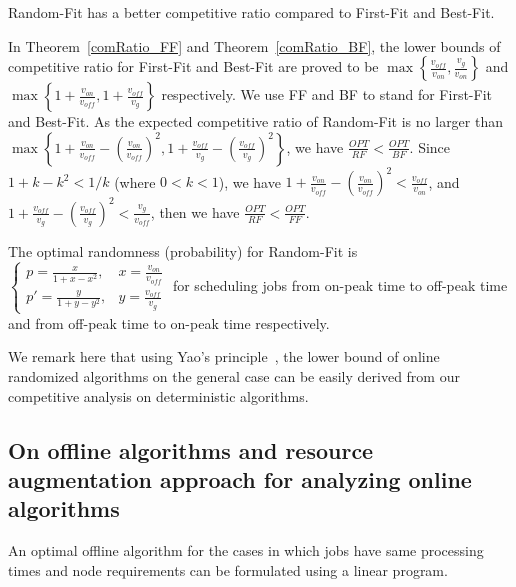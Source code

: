 \documentclass[conference]{IEEEtran}
\begin{document}
\begin{corollary}
Random-Fit has a better competitive ratio compared to First-Fit and Best-Fit.
\end{corollary}

\begin{IEEEproof}
In Theorem~\ref{comRatio_FF} and Theorem~\ref{comRatio_BF}, the lower bounds of competitive ratio for First-Fit and Best-Fit are proved to be $\max \left\lbrace\frac{v_{off}}{v_{on}}, \frac{v_g}{v_{on}}\right\rbrace$ and $\max\left\lbrace 1 + \frac{v_{on}}{v_{off}}, 1 + \frac{v_{off}}{v_g}\right\rbrace$ respectively.
We use FF and BF to stand for First-Fit and Best-Fit. As the expected competitive ratio of Random-Fit is no larger than $\max\left\{1 + \frac{v_{on}}{v_{off}} - \left(\frac{v_{on}}{v_{off}}\right)^2, 1 + \frac{v_{off}}{v_g} - \left(\frac{v_{off}}{v_g}\right)^2\right\}$, we have $\frac{OPT}{RF} < \frac{OPT}{BF}$. Since $1 + k - k^2 < 1 / k$ (where $0 < k <1$), we have $1 + \frac{v_{on}}{v_{off}} - \left(\frac{v_{on}}{v_{off}}\right)^{2} < \frac{v_{off}}{v_{on}}$, and $1 + \frac{v_{off}}{v_g} - \left(\frac{v_{off}}{v_g}\right)^2  < \frac{v_g}{v_{off}}$, then we have $\frac{OPT}{RF} < \frac{OPT}{FF}$.
\end{IEEEproof}

\begin{corollary}
The optimal randomness (probability) for Random-Fit is $\begin{cases}
p = \frac{x}{1 + x - x^2}, & x = \frac{v_{on}}{v_{off}}\\
p' = \frac{y}{1 + y - y^2}, & y = \frac{v_{off}}{v_g}
\end{cases}$ for scheduling jobs from on-peak time to off-peak time and from off-peak time to on-peak time respectively.
\end{corollary}

We remark here that using Yao's principle~\cite{Yao77, BorodinE98}, the lower bound of online randomized algorithms on the general case can be easily derived from our competitive analysis on deterministic algorithms.



\subsection{On offline algorithms and resource augmentation approach for analyzing online algorithms}

An optimal offline algorithm for the cases in which jobs have same processing times and node requirements can be formulated using a linear program.
\end{document}

